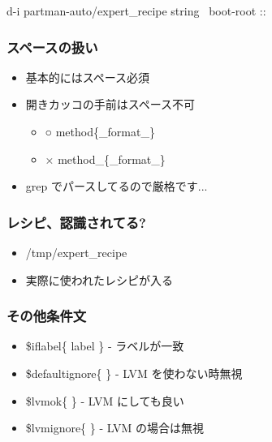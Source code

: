 \documentclass[mingoth,a4paper]{jsarticle}
\begin{document}
\begin{commandline}
d-i partman-auto/expert_recipe string                         \
      boot-root ::                                            \
\end{commandline}

\subsubsection{スペースの扱い}
\begin{itemize}
\item 基本的にはスペース必須
\item 開きカッコの手前はスペース不可
  \begin{itemize}
  \item ○ method\{\_format\_\}
  \item × method\_\{\_format\_\}
  \end{itemize}
\item grep でパースしてるので厳格です...
\end{itemize}

\subsubsection{レシピ、認識されてる?}
\begin{itemize}
\item /tmp/expert\_recipe
\item 実際に使われたレシピが入る
\end{itemize}


\subsubsection{その他条件文}
\begin{itemize}
\item \$iflabel\{ label \} - ラベルが一致
\item \$defaultignore\{ \} - LVM を使わない時無視
\item \$lvmok\{ \} - LVM にしても良い
\item \$lvmignore\{ \} - LVM の場合は無視
\end{itemize}
\end{document}
